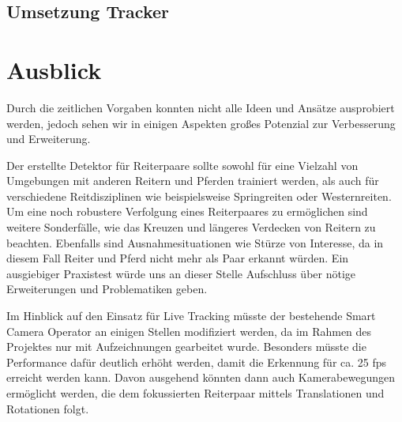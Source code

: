 \subsection*{Umsetzung Tracker}



\section{Ausblick}
Durch die zeitlichen Vorgaben konnten nicht alle Ideen und Ansätze ausprobiert werden, jedoch sehen wir in einigen Aspekten großes Potenzial zur Verbesserung und Erweiterung.

Der erstellte Detektor für Reiterpaare sollte sowohl für eine Vielzahl von Umgebungen mit anderen Reitern und Pferden trainiert werden, als auch für verschiedene Reitdisziplinen wie beispielsweise Springreiten oder Westernreiten. 
Um eine noch robustere Verfolgung eines Reiterpaares zu ermöglichen sind weitere Sonderfälle, wie das Kreuzen und längeres Verdecken von Reitern zu beachten. Ebenfalls sind Ausnahmesituationen wie Stürze von Interesse, da in diesem Fall Reiter und Pferd nicht mehr als Paar erkannt würden.
Ein ausgiebiger Praxistest würde uns an dieser Stelle Aufschluss über nötige Erweiterungen und Problematiken geben.

Im Hinblick auf den Einsatz für Live Tracking müsste der bestehende Smart Camera Operator an einigen Stellen modifiziert werden, da im Rahmen des Projektes nur mit Aufzeichnungen gearbeitet wurde. Besonders müsste die Performance dafür deutlich erhöht werden, damit die Erkennung für ca. 25 fps erreicht werden kann. Davon ausgehend könnten dann auch Kamerabewegungen ermöglicht werden, die dem fokussierten Reiterpaar mittels Translationen und Rotationen folgt.

